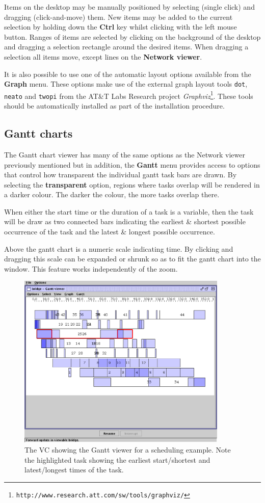Items on the desktop may be manually positioned by selecting (single
click) and dragging (click-and-move) them.  New items may be added to
the current selection by holding down the \textbf{Ctrl} key whilst
clicking with the left mouse button.  Ranges of items are selected by
clicking on the background of the desktop and dragging a selection
rectangle around the desired items.  When dragging a selection all
items move, except lines on the \textbf{Network viewer}.

It is also possible to use one of the automatic layout options
available from the \textbf{Graph} menu.  These options make use of the
external graph layout tools \texttt{dot}, \texttt{neato} and
\texttt{twopi} from the AT\&T Labs Research project
\emph{Graphviz}\footnote{\texttt{http://www.research.att.com/sw/tools/graphviz/}}.
These tools should be automatically installed as part of the
{\eclipse} installation procedure.

\subsection{Gantt charts}

The Gantt chart viewer has many of the same options as the Network
viewer previously mentioned but in addition, the \textbf{Gantt} menu
provides access to options that control how transparent the individual
gantt task bars are drawn.  By selecting the \textbf{transparent}
option, regions where tasks overlap will be rendered in a darker
colour.  The darker the colour, the more tasks overlap there.

When either the start time or the duration of a task is a variable,
then the task will be draw as two connected bars indicating the
earliest \& shortest possible occurrence of the task and the latest \&
longest possible occurrence.

Above the gantt chart is a numeric scale indicating time.  By clicking
and dragging this scale can be expanded or shrunk so as to fit the
gantt chart into the window.  This feature works independently of the
zoom.
\begin{figure}[htsp]
\centering
\includegraphics[width=10cm]{vcbridgeexample}
\caption{The VC showing the Gantt viewer for a scheduling
example. Note the highlighted task showing the earliest start/shortest
and latest/longest times of the task.}
\label{fig:bridgeexample}
\end{figure}


